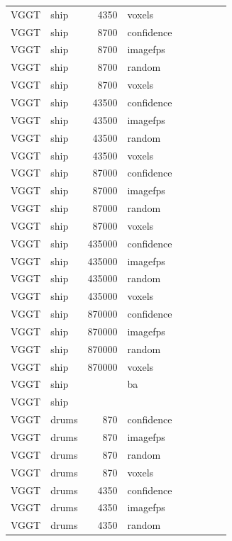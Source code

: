 \begin{table}[H]
\begin{tabular}{llrlrrrrr}
VGGT & ship & 4350 & voxels &  &  &  &  &  \\
VGGT & ship & 8700 & confidence &  &  &  &  &  \\
VGGT & ship & 8700 & imagefps &  &  &  &  &  \\
VGGT & ship & 8700 & random &  &  &  &  &  \\
VGGT & ship & 8700 & voxels &  &  &  &  &  \\
VGGT & ship & 43500 & confidence &  &  &  &  &  \\
VGGT & ship & 43500 & imagefps &  &  &  &  &  \\
VGGT & ship & 43500 & random &  &  &  &  &  \\
VGGT & ship & 43500 & voxels &  &  &  &  &  \\
VGGT & ship & 87000 & confidence &  &  &  &  &  \\
VGGT & ship & 87000 & imagefps &  &  &  &  &  \\
VGGT & ship & 87000 & random &  &  &  &  &  \\
VGGT & ship & 87000 & voxels &  &  &  &  &  \\
VGGT & ship & 435000 & confidence &  &  &  &  &  \\
VGGT & ship & 435000 & imagefps &  &  &  &  &  \\
VGGT & ship & 435000 & random &  &  &  &  &  \\
VGGT & ship & 435000 & voxels &  &  &  &  &  \\
VGGT & ship & 870000 & confidence &  &  &  &  &  \\
VGGT & ship & 870000 & imagefps &  &  &  &  &  \\
VGGT & ship & 870000 & random &  &  &  &  &  \\
VGGT & ship & 870000 & voxels &  &  &  &  &  \\
VGGT & ship &  & ba &  &  &  &  &  \\
VGGT & ship &  &  &  &  &  &  &  \\
\midrule
VGGT & drums & 870 & confidence &  &  &  &  &  \\
VGGT & drums & 870 & imagefps &  &  &  &  &  \\
VGGT & drums & 870 & random &  &  &  &  &  \\
VGGT & drums & 870 & voxels &  &  &  &  &  \\
VGGT & drums & 4350 & confidence &  &  &  &  &  \\
VGGT & drums & 4350 & imagefps &  &  &  &  &  \\
VGGT & drums & 4350 & random &  &  &  &  &  \\

\end{tabular}
\end{table}
